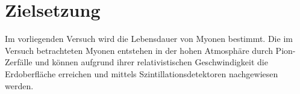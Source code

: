 \section{Zielsetzung}
\label{sec:Zielsetzung}
Im vorliegenden Versuch wird die Lebensdauer von Myonen bestimmt. Die im Versuch betrachteten Myonen entstehen in der hohen Atmosphäre durch Pion-Zerfälle und können aufgrund ihrer relativistischen Geschwindigkeit die Erdoberfläche erreichen und mittels Szintillationsdetektoren nachgewiesen werden.
